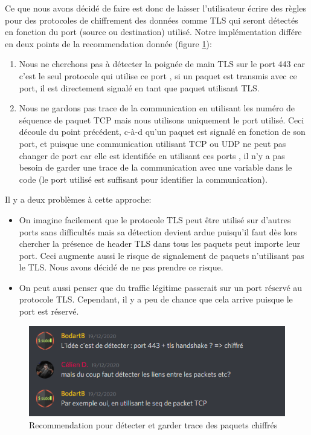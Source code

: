 \documentclass[a4paper]{article}
\begin{document}
Ce que nous avons décidé de faire est donc de laisser l'utilisateur écrire des règles pour des protocoles de chiffrement des données comme TLS qui seront détectés en fonction du port (source ou destination) utilisé. Notre implémentation différe en deux points de la recommendation donnée (figure \ref{fig:tls01}):
\begin{enumerate}
    \item Nous ne cherchons pas à détecter la poignée de main TLS sur le port 443 car c'est le seul protocole qui utilise ce port \cite{5}, si un paquet est transmis avec ce port, il est directement signalé en tant que paquet utilisant TLS.
    \item Nous ne gardons pas trace de la communication en utilisant les numéro de séquence de paquet TCP mais nous utilisons uniquement le port utilisé. Ceci découle du point précédent, c-à-d qu'un paquet est signalé en fonction de son port, et puisque une communication utilisant TCP ou UDP ne peut pas changer de port car elle est identifiée en utilisant ces ports \cite{4}, il n'y a pas besoin de garder une trace de la communication avec une variable dans le code (le port utilisé est suffisant pour identifier la communication).
\end{enumerate}
Il y a deux problèmes à cette approche:
\begin{itemize}
    \item On imagine facilement que le protocole TLS peut être utilisé sur d'autres ports sans difficultés mais sa détection devient ardue puisqu'il faut dès lors chercher la présence de header TLS dans tous les paquets peut importe leur port. Ceci augmente aussi le risque de signalement de paquets n'utilisant pas le TLS. Nous avons décidé de ne pas prendre ce risque.
    \item On peut aussi penser que du traffic légitime passerait sur un port réservé au protocole TLS. Cependant, il y a peu de chance que cela arrive puisque le port est réservé.
\end{itemize}

\begin{figure}[H]
    \centering
    \includegraphics[width=0.75\linewidth]{images/tls-01.PNG}
    \caption{Recommendation pour détecter et garder trace des paquets chiffrés}
    \label{fig:tls01}
\end{figure}
\end{document}
